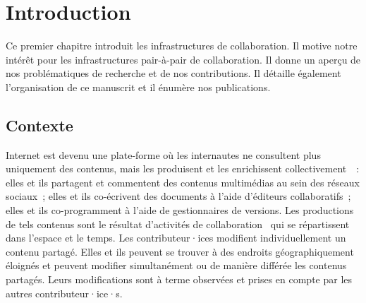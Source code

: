 
\chapter{Introduction}

\minitoc{}
\bigskip

Ce premier chapitre introduit les infrastructures de collaboration. Il motive notre intérêt pour les infrastructures pair-à-pair de collaboration.
Il donne un aperçu de nos problématiques de recherche et de nos contributions.
Il détaille également l'organisation de ce manuscrit et il énumère nos publications.

\clearpage
\section{Contexte}


%
%



Internet est devenu une plate-forme où les internautes ne consultent plus uniquement des contenus, mais les produisent et les enrichissent collectivement~\autocite{mogan2010_web2groupware}~: elles et ils partagent et commentent des contenus multimédias au sein des réseaux sociaux~; elles et ils co-écrivent des documents à l'aide d'éditeurs collaboratifs~; elles et ils co-programment à l'aide de gestionnaires de versions.
Les productions de tels contenus sont le résultat d'activités de collaboration~\autocite{ellis1991_groupware} qui se répartissent dans l'espace et le temps.
Les contributeur·ices modifient individuellement un contenu partagé.
Elles et ils peuvent se trouver à des endroits géographiquement éloignés et peuvent modifier simultanément ou de manière différée les contenus partagés.
Leurs modifications sont à terme observées et prises en compte par les autres contributeur·ice·s.

